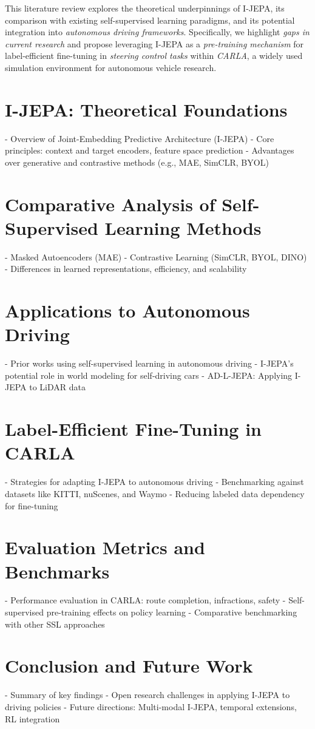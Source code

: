 \documentclass{article}
\begin{document}
This literature review explores the theoretical underpinnings of I-JEPA, its comparison with existing self-supervised learning paradigms, and its potential integration into \textit{autonomous driving frameworks}. Specifically, we highlight \textit{gaps in current research} and propose leveraging I-JEPA as a \textit{pre-training mechanism} for label-efficient fine-tuning in \textit{steering control tasks} within \textit{CARLA}, a widely used simulation environment for autonomous vehicle research.

\section{I-JEPA: Theoretical Foundations}
- Overview of Joint-Embedding Predictive Architecture (I-JEPA)
- Core principles: context and target encoders, feature space prediction
- Advantages over generative and contrastive methods (e.g., MAE, SimCLR, BYOL)

\section{Comparative Analysis of Self-Supervised Learning Methods}
- Masked Autoencoders (MAE)
- Contrastive Learning (SimCLR, BYOL, DINO)
- Differences in learned representations, efficiency, and scalability

\section{Applications to Autonomous Driving}
- Prior works using self-supervised learning in autonomous driving
- I-JEPA’s potential role in world modeling for self-driving cars
- AD-L-JEPA: Applying I-JEPA to LiDAR data

\section{Label-Efficient Fine-Tuning in CARLA}
- Strategies for adapting I-JEPA to autonomous driving
- Benchmarking against datasets like KITTI, nuScenes, and Waymo
- Reducing labeled data dependency for fine-tuning

\section{Evaluation Metrics and Benchmarks}
- Performance evaluation in CARLA: route completion, infractions, safety
- Self-supervised pre-training effects on policy learning
- Comparative benchmarking with other SSL approaches

\section{Conclusion and Future Work}
- Summary of key findings
- Open research challenges in applying I-JEPA to driving policies
- Future directions: Multi-modal I-JEPA, temporal extensions, RL integration



\end{document}
